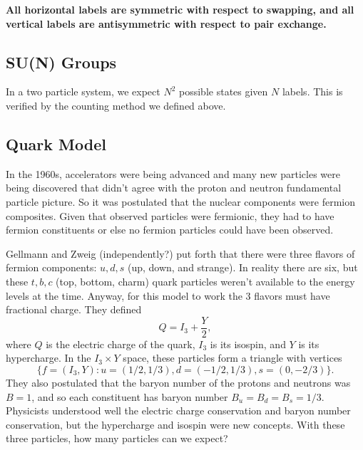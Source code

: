 \documentclass[fontsize=12pt]{scrartcl}
\begin{document}
\textbf{All horizontal labels are symmetric with respect to swapping, and all vertical labels are antisymmetric with respect to pair exchange.}


\subsection{SU(N) Groups}

In a two particle system, we expect $N^2$ possible states given $N$ labels. This is verified by the counting method we defined above.

\subsection{Quark Model}

In the 1960s, accelerators were being advanced and many new particles were being discovered that didn't agree with the proton and neutron fundamental particle picture. So it was postulated that the nuclear components were fermion composites. Given that observed particles were fermionic, they had to have fermion constituents or else no fermion particles could have been observed.

Gellmann and Zweig (independently?) put forth that there were three flavors of fermion components: $u, d, s$ (up, down, and strange). In reality there are six, but these $t,b,c$ (top, bottom, charm) quark particles weren't available to the energy levels at the time. Anyway, for this model to work the 3 flavors must have fractional charge. They defined $$Q=I_3+\frac{Y}{2},$$ where $Q$ is the electric charge of the quark, $I_3$ is its isospin, and $Y$ is its hypercharge. In the $I_3\times Y$ space, these particles form a triangle with vertices $$\{f=(I_3, Y): u=(1/2, 1/3), d = (-1/2, 1/3), s=(0, -2/3)\}.$$ They also postulated that the baryon number of the protons and neutrons was $B=1$, and so each constituent has baryon number $B_u=B_d=B_s=1/3$. Physicists understood well the electric charge conservation and baryon number conservation, but the hypercharge and isospin were new concepts. With these three particles, how many particles can we expect?
\end{document}
